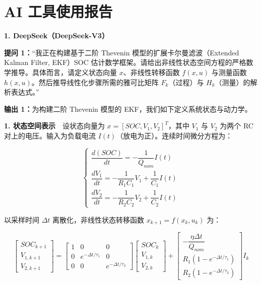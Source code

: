 \documentclass[11pt,a4paper]{ctexart}
\begin{document}
\section*{AI 工具使用报告}

\noindent\textbf{1. DeepSeek（DeepSeek-V3）}

\noindent\textbf{提问 1：}“我正在构建基于二阶 Thevenin 模型的扩展卡尔曼滤波（Extended Kalman Filter, EKF）SOC 估计数学框架。请给出非线性状态空间方程的严格数学推导。具体而言，请定义状态向量 $x$、非线性转移函数 $f(x,u)$ 与测量函数 $h(x,u)$。然后推导线性化步骤所需的雅可比矩阵 $F_k$（过程）与 $H_k$（测量）的解析表达式。”

\noindent\textbf{输出 1：}为构建二阶 Thevenin 模型的 EKF，我们如下定义系统状态与动力学。

\noindent\textbf{1. 状态空间表示}　设状态向量为 $x = [SOC, V_1, V_2]^T$，其中 $V_1$ 与 $V_2$ 为两个 RC 对上的电压。输入为负载电流 $I(t)$（放电为正）。连续时间微分方程为：

\begin{equation*}
\begin{cases}
\dfrac{d(SOC)}{dt} = -\dfrac{1}{Q_{nom}}I(t) \\[8pt]
\dfrac{dV_1}{dt} = -\dfrac{1}{R_1C_1}V_1 + \dfrac{1}{C_1}I(t) \\[8pt]
\dfrac{dV_2}{dt} = -\dfrac{1}{R_2C_2}V_2 + \dfrac{1}{C_2}I(t)
\end{cases}
\end{equation*}

以采样时间 $\Delta t$ 离散化，非线性状态转移函数 $x_{k+1} = f(x_k, u_k)$ 为：

\begin{equation*}
\begin{bmatrix}
SOC_{k+1} \\ V_{1,k+1} \\ V_{2,k+1}
\end{bmatrix}
=
\begin{bmatrix}
1 & 0 & 0 \\
0 & e^{-\Delta t/\tau_1} & 0 \\
0 & 0 & e^{-\Delta t/\tau_2}
\end{bmatrix}
\begin{bmatrix}
SOC_k \\ V_{1,k} \\ V_{2,k}
\end{bmatrix}
+
\begin{bmatrix}
-\dfrac{\eta \Delta t}{Q_{nom}} \\[8pt]
R_1\left(1 - e^{-\Delta t/\tau_1}\right) \\[8pt]
R_2\left(1 - e^{-\Delta t/\tau_2}\right)
\end{bmatrix}
I_k
\end{equation*}
\end{document}
